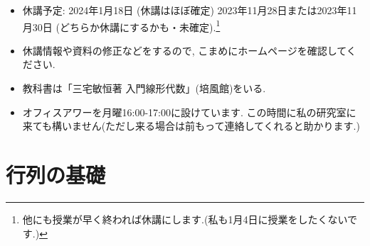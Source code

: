 \documentclass[dvipdfmx,a4paper,11pt]{article}
\theoremstyle{definition}
\begin{document}
\vspace{11pt}
\begin{itemize}
  \setlength{\parskip}{0cm} %
  \setlength{\itemsep}{0cm} %
  \item 休講予定: 2024年1月18日 (休講はほぼ確定) 2023年11月28日または2023年11月30日 (どちらか休講にするかも・未確定).\footnote{他にも授業が早く終われば休講にします.(私も1月4日に授業をしたくないです.) } 
  \item 休講情報や資料の修正などをするので, こまめにホームページを確認してください.
  \item 教科書は「三宅敏恒著 入門線形代数」(培風館)をいる.
   \item オフィスアワーを月曜16:00-17:00に設けています. この時間に私の研究室に来ても構いません(ただし来る場合は前もって連絡してくれると助かります.)
 \end{itemize}


\newpage 


\section{行列の基礎}
\label{sec-1}
\end{document}
